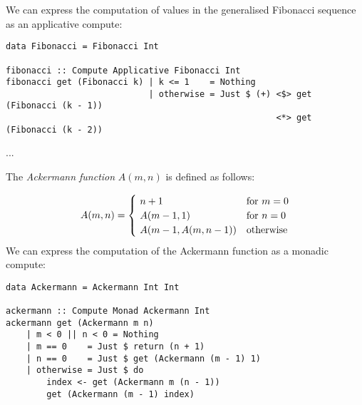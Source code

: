 We can express the computation of values in the generalised Fibonacci sequence
as an applicative compute:

\begin{verbatim}
data Fibonacci = Fibonacci Int

fibonacci :: Compute Applicative Fibonacci Int
fibonacci get (Fibonacci k) | k <= 1    = Nothing
                            | otherwise = Just $ (+) <$> get (Fibonacci (k - 1))
                                                     <*> get (Fibonacci (k - 2))
\end{verbatim}

...

The \emph{Ackermann function} $A(m, n)$ is defined as follows:

\[
A(m, n) = {\begin{cases}~n+1&{\text{for }}m=0\\~A(m-1, 1)&{\text{for }}n=0\\~A(m-1,A(m,n-1))&{\text{otherwise}}\end{cases}}
\vspace{2mm}
\]
\noindent
We can express the computation of the Ackermann function as a monadic compute:

\begin{verbatim}
data Ackermann = Ackermann Int Int

ackermann :: Compute Monad Ackermann Int
ackermann get (Ackermann m n)
    | m < 0 || n < 0 = Nothing
    | m == 0    = Just $ return (n + 1)
    | n == 0    = Just $ get (Ackermann (m - 1) 1)
    | otherwise = Just $ do
        index <- get (Ackermann m (n - 1))
        get (Ackermann (m - 1) index)
\end{verbatim}